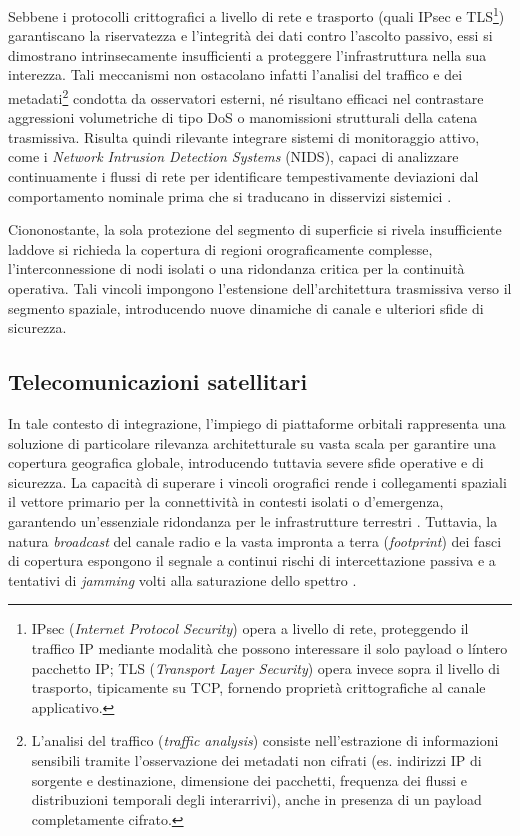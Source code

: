 Sebbene i protocolli crittografici a livello di rete e trasporto (quali IPsec e TLS\footnote{IPsec (\textit{Internet Protocol Security}) opera a livello di rete, proteggendo il traffico IP mediante modalità che possono interessare il solo payload o l\'intero pacchetto IP; TLS (\textit{Transport Layer Security}) opera invece sopra il livello di trasporto, tipicamente su TCP, fornendo proprietà crittografiche al canale applicativo.}) garantiscano la riservatezza e l'integrità dei dati contro l'ascolto passivo, essi si dimostrano intrinsecamente insufficienti a proteggere l'infrastruttura nella sua interezza. 
Tali meccanismi non ostacolano infatti l'analisi del traffico e dei metadati\footnote{L'analisi del traffico (\textit{traffic analysis}) consiste nell'estrazione di informazioni sensibili tramite l'osservazione dei metadati non cifrati (es. indirizzi IP di sorgente e destinazione, dimensione dei pacchetti, frequenza dei flussi e distribuzioni temporali degli interarrivi), anche in presenza di un payload completamente cifrato.} condotta da osservatori esterni, né risultano efficaci nel contrastare aggressioni volumetriche di tipo DoS o manomissioni strutturali della catena trasmissiva. 
Risulta quindi rilevante integrare sistemi di monitoraggio attivo, come i \textit{Network Intrusion Detection Systems} (NIDS), capaci di analizzare continuamente i flussi di rete per identificare tempestivamente deviazioni dal comportamento nominale prima che si traducano in disservizi sistemici \cite{khraisat2019}.

Ciononostante, la sola protezione del segmento di superficie si rivela insufficiente laddove si richieda la copertura di regioni orograficamente complesse, l'interconnessione di nodi isolati o una ridondanza critica per la continuità operativa. 
Tali vincoli impongono l'estensione dell'architettura trasmissiva verso il segmento spaziale, introducendo nuove dinamiche di canale e ulteriori sfide di sicurezza.

\subsection{Telecomunicazioni satellitari}
\label{subsec:telecomunicazioni_satellitari}

In tale contesto di integrazione, l'impiego di piattaforme orbitali rappresenta una soluzione di particolare rilevanza architetturale su vasta scala per garantire una copertura geografica globale, introducendo tuttavia severe sfide operative e di sicurezza. 
La capacità di superare i vincoli orografici rende i collegamenti spaziali il vettore primario per la connettività in contesti isolati o d'emergenza, garantendo un'essenziale ridondanza per le infrastrutture terrestri \cite{kodheli2021}. 
Tuttavia, la natura \textit{broadcast} del canale radio e la vasta impronta a terra (\textit{footprint}) dei fasci di copertura espongono il segnale a continui rischi di intercettazione passiva e a tentativi di \textit{jamming} volti alla saturazione dello spettro \cite{nist2022}.

